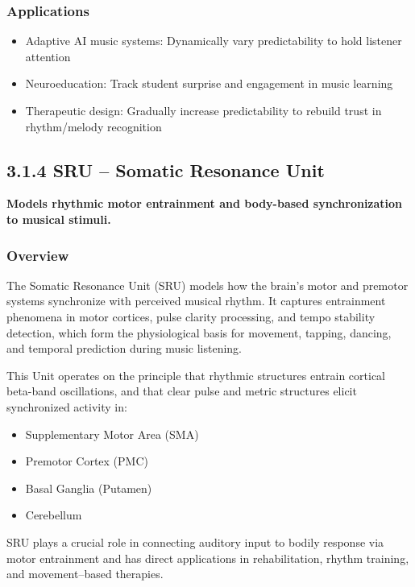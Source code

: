 \subsubsection*{Applications}

\begin{itemize}
    \item Adaptive AI music systems: Dynamically vary predictability to hold listener attention
    \item Neuroeducation: Track student surprise and engagement in music learning
    \item Therapeutic design: Gradually increase predictability to rebuild trust in rhythm/melody recognition
\end{itemize}

\subsection*{3.1.4 SRU – Somatic Resonance Unit}

\textbf{Models rhythmic motor entrainment and body-based synchronization to musical stimuli.}

\subsubsection*{Overview}

The Somatic Resonance Unit (SRU) models how the brain's motor and premotor systems synchronize with perceived musical rhythm. It captures entrainment phenomena in motor cortices, pulse clarity processing, and tempo stability detection, which form the physiological basis for movement, tapping, dancing, and temporal prediction during music listening.

This Unit operates on the principle that rhythmic structures entrain cortical beta-band oscillations, and that clear pulse and metric structures elicit synchronized activity in:

\begin{itemize}
    \item Supplementary Motor Area (SMA)
    \item Premotor Cortex (PMC)
    \item Basal Ganglia (Putamen)
    \item Cerebellum
\end{itemize}

SRU plays a crucial role in connecting auditory input to bodily response via motor entrainment and has direct applications in rehabilitation, rhythm training, and movement–based therapies.

